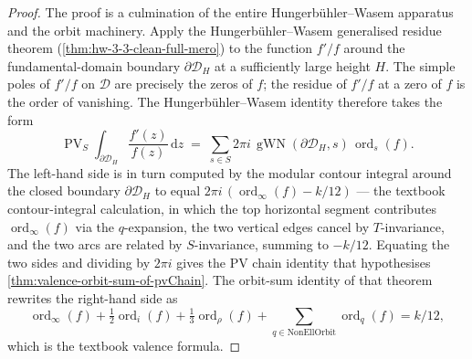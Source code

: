 \begin{proof}
  \leanok
  The proof is a culmination of the entire Hungerbühler--Wasem
  apparatus and the orbit machinery. Apply the
  Hungerbühler--Wasem generalised residue theorem
  (\cref{thm:hw-3-3-clean-full-mero}) to the function $f'/f$ around
  the fundamental-domain boundary $\partial \mathcal{D}_H$ at a
  sufficiently large height $H$. The simple poles of $f'/f$ on
  $\mathcal{D}$ are precisely the zeros of $f$; the residue of $f'/f$
  at a zero of $f$ is the order of vanishing. The
  Hungerbühler--Wasem identity therefore takes the form
  \[
    \operatorname{PV}_S\!\!\int_{\partial \mathcal{D}_H}
      \frac{f'(z)}{f(z)}\,\mathrm{d}z
    \;=\; \sum_{s \in S} 2 \pi i \,
      \operatorname{gWN}(\partial \mathcal{D}_H, s) \,
        \operatorname{ord}_{s}(f).
  \]
  The left-hand side is in turn computed by the modular contour
  integral around the closed boundary $\partial \mathcal{D}_H$ to
  equal $2\pi i \, (\operatorname{ord}_\infty(f) - k/12)$ — the
  textbook contour-integral calculation, in which the top horizontal
  segment contributes $\operatorname{ord}_\infty(f)$ via the
  $q$-expansion, the two vertical edges cancel by $T$-invariance, and
  the two arcs are related by $S$-invariance, summing to $-k/12$.
  Equating the two sides and dividing by $2 \pi i$ gives the PV
  chain identity that hypothesises
  \cref{thm:valence-orbit-sum-of-pvChain}. The orbit-sum identity
  of that theorem rewrites the right-hand side as
  \[
    \operatorname{ord}_\infty(f) +
      \tfrac{1}{2}\operatorname{ord}_i(f) +
      \tfrac{1}{3}\operatorname{ord}_\rho(f) +
      \sum_{q \in \mathrm{NonEllOrbit}} \operatorname{ord}_{q}(f) = k/12,
  \]
  which is the textbook valence formula.
\end{proof}
